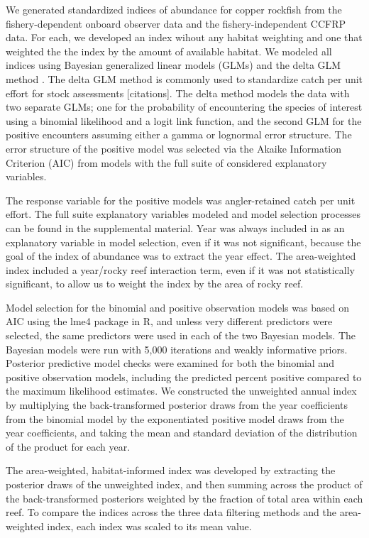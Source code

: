 \documentclass[
  12pt,
  authoryear,
  preprint,
  3p]{elsarticle}
\begin{document}
We generated standardized indices of abundance for copper rockfish from
the fishery-dependent onboard observer data and the fishery-independent
CCFRP data. For each, we developed an index wihout any habitat weighting
and one that weighted the the index by the amount of available habitat.
We modeled all indices using Bayesian generalized linear models (GLMs)
and the delta GLM method \citep{Lo:1992:IRA, Stefansson:1996:AGS}. The
delta GLM method is commonly used to standardize catch per unit effort
for stock assessments {[}citations{]}. The delta method models the data
with two separate GLMs; one for the probability of encountering the
species of interest using a binomial likelihood and a logit link
function, and the second GLM for the positive encounters assuming either
a gamma or lognormal error structure. The error structure of the
positive model was selected via the Akaike Information Criterion (AIC)
from models with the full suite of considered explanatory variables.

The response variable for the positive models was angler-retained catch
per unit effort. The full suite explanatory variables modeled and model
selection processes can be found in the supplemental material. Year was
always included in as an explanatory variable in model selection, even
if it was not significant, because the goal of the index of abundance
was to extract the year effect. The area-weighted index included a
year/rocky reef interaction term, even if it was not statistically
significant, to allow us to weight the index by the area of rocky reef.

Model selection for the binomial and positive observation models was
based on AIC using the lme4 package in R, and unless very different
predictors were selected, the same predictors were used in each of the
two Bayesian models. The Bayesian models were run with 5,000 iterations
and weakly informative priors. Posterior predictive model checks were
examined for both the binomial and positive observation models,
including the predicted percent positive compared to the maximum
likelihood estimates. We constructed the unweighted annual index by
multiplying the back-transformed posterior draws from the year
coefficients from the binomial model by the exponentiated positive model
draws from the year coefficients, and taking the mean and standard
deviation of the distribution of the product for each year.

The area-weighted, habitat-informed index was developed by extracting
the posterior draws of the unweighted index, and then summing across the
product of the back-transformed posteriors weighted by the fraction of
total area within each reef. To compare the indices across the three
data filtering methods and the area-weighted index, each index was
scaled to its mean value.
\end{document}
